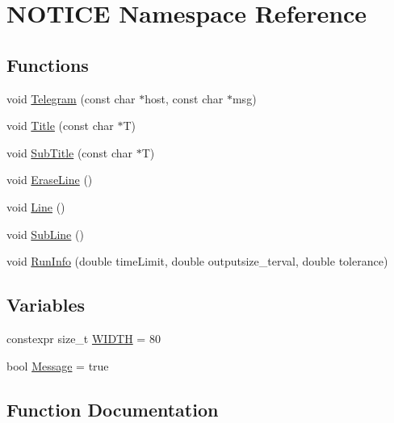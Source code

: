 \hypertarget{namespace_n_o_t_i_c_e}{}\section{N\+O\+T\+I\+CE Namespace Reference}
\label{namespace_n_o_t_i_c_e}
\subsection*{Functions}
\begin{DoxyCompactItemize}
\item 
void \mbox{\hyperlink{namespace_n_o_t_i_c_e_a7f45e7bbaeb797160d77c7c5dbbb37a6}{Telegram}} (const char $\ast$host, const char $\ast$msg)
\item 
void \mbox{\hyperlink{namespace_n_o_t_i_c_e_a0ddfb0ca7dfa968616d34f4752368bba}{Title}} (const char $\ast$T)
\item 
void \mbox{\hyperlink{namespace_n_o_t_i_c_e_a483b62c015a4211e2716f730ad2c0a44}{Sub\+Title}} (const char $\ast$T)
\item 
void \mbox{\hyperlink{namespace_n_o_t_i_c_e_a46fcf4944d7c1d3cc4d821297b0e4bf8}{Erase\+Line}} ()
\item 
void \mbox{\hyperlink{namespace_n_o_t_i_c_e_a9536e3b7bb1f9b6af83b1a5cdf3a56d3}{Line}} ()
\item 
void \mbox{\hyperlink{namespace_n_o_t_i_c_e_a782778073f9df89a3d20a7faa16494aa}{Sub\+Line}} ()
\item 
void \mbox{\hyperlink{namespace_n_o_t_i_c_e_ab85b7138c5f1deaeeedad94b7bad2477}{Run\+Info}} (double time\+Limit, double outputsize\+\_\+terval, double tolerance)
\end{DoxyCompactItemize}
\subsection*{Variables}
\begin{DoxyCompactItemize}
\item 
constexpr size\+\_\+t \mbox{\hyperlink{namespace_n_o_t_i_c_e_a31f6fb221f22faf96b9cfb05315d1d3e}{W\+I\+D\+TH}} = 80
\item 
bool \mbox{\hyperlink{namespace_n_o_t_i_c_e_a4de9d52506c4de1641e95f4f53669e3f}{Message}} = true
\end{DoxyCompactItemize}


\subsection{Function Documentation}
\mbox{\label{namespace_n_o_t_i_c_e_a46fcf4944d7c1d3cc4d821297b0e4bf8}} 
